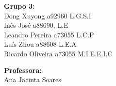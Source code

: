 \begin{titlepage}
\begin{center}
		{\large{\bf{Grupo 3:}}{\normalsize\vspace{3mm}
	\\ \large{Dong Xuyong a92960 L.G.S.I\\ Inês José a88690, L.E \\ Leandro Pereira a73055 L.C.P \\ Luís Zhou a88608 L.E.A \\ Ricardo Oliveira a73055 M.I.E.E.I.C \vspace{3mm}}}}

\end{center}
\hfill
\begin{center}
	{\large{\bf{Professora:}}{\normalsize\vspace{3mm} \\ \large{Ana Jacinta Soares\\ }}}
\end{center}

\vspace{20mm}
\hrulefill
\\

\end{titlepage}